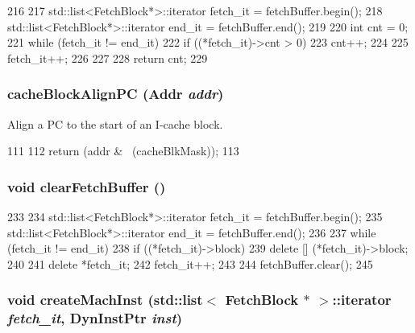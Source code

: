 \begin{DoxyCode}
216 {
217     std::list<FetchBlock*>::iterator fetch_it = fetchBuffer.begin();
218     std::list<FetchBlock*>::iterator end_it = fetchBuffer.end();
219 
220     int cnt = 0;
221     while (fetch_it != end_it) {
222         if ((*fetch_it)->cnt > 0)
223             cnt++;
224 
225         fetch_it++;
226     }
227 
228     return cnt;
229 }
\end{DoxyCode}
\hypertarget{classFetchUnit_ab36871bdfd10e2b804a650594462b36e}{
\subsubsection[{cacheBlockAlignPC}]{ cacheBlockAlignPC ({\bf Addr} {\em addr})}}
\label{classFetchUnit_ab36871bdfd10e2b804a650594462b36e}
Align a PC to the start of an I-\/cache block. 


\begin{DoxyCode}
111     {
112         return (addr & ~(cacheBlkMask));
113     }
\end{DoxyCode}
\hypertarget{classFetchUnit_a2ccfb855f570dc8e39e9d25d3fb845a3}{
\subsubsection[{clearFetchBuffer}]{\setlength{\rightskip}{0pt plus 5cm}void clearFetchBuffer ()}}
\label{classFetchUnit_a2ccfb855f570dc8e39e9d25d3fb845a3}



\begin{DoxyCode}
233 {
234     std::list<FetchBlock*>::iterator fetch_it = fetchBuffer.begin();
235     std::list<FetchBlock*>::iterator end_it = fetchBuffer.end();
236 
237     while (fetch_it != end_it) {
238         if ((*fetch_it)->block) {
239             delete [] (*fetch_it)->block;
240         }
241         delete *fetch_it;
242         fetch_it++;
243     }
244     fetchBuffer.clear();
245 }
\end{DoxyCode}
\hypertarget{classFetchUnit_a38dd226fde9580d1753032305635353f}{
\subsubsection[{createMachInst}]{\setlength{\rightskip}{0pt plus 5cm}void createMachInst ({\bf std::list}$<$ {\bf FetchBlock} $\ast$ $>$::iterator {\em fetch\_\-it}, \/  {\bf DynInstPtr} {\em inst})}}
\label{classFetchUnit_a38dd226fde9580d1753032305635353f}



